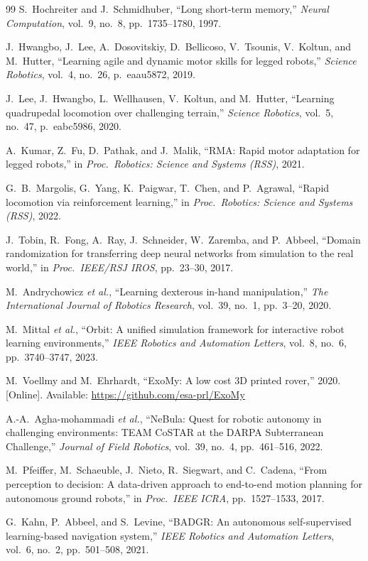 \documentclass[12pt,a4paper]{article}
\begin{document}
\begin{thebibliography}{99}
S.~Hochreiter and J.~Schmidhuber, ``Long short-term memory,'' \textit{Neural Computation}, vol.~9, no.~8, pp.~1735--1780, 1997.

J.~Hwangbo, J.~Lee, A.~Dosovitskiy, D.~Bellicoso, V.~Tsounis, V.~Koltun, and M.~Hutter, ``Learning agile and dynamic motor skills for legged robots,'' \textit{Science Robotics}, vol.~4, no.~26, p.~eaau5872, 2019.

J.~Lee, J.~Hwangbo, L.~Wellhausen, V.~Koltun, and M.~Hutter, ``Learning quadrupedal locomotion over challenging terrain,'' \textit{Science Robotics}, vol.~5, no.~47, p.~eabc5986, 2020.

A.~Kumar, Z.~Fu, D.~Pathak, and J.~Malik, ``RMA: Rapid motor adaptation for legged robots,'' in \textit{Proc.\ Robotics: Science and Systems (RSS)}, 2021.

G.~B.~Margolis, G.~Yang, K.~Paigwar, T.~Chen, and P.~Agrawal, ``Rapid locomotion via reinforcement learning,'' in \textit{Proc.\ Robotics: Science and Systems (RSS)}, 2022.

J.~Tobin, R.~Fong, A.~Ray, J.~Schneider, W.~Zaremba, and P.~Abbeel, ``Domain randomization for transferring deep neural networks from simulation to the real world,'' in \textit{Proc.\ IEEE/RSJ IROS}, pp.~23--30, 2017.

M.~Andrychowicz \textit{et al.}, ``Learning dexterous in-hand manipulation,'' \textit{The International Journal of Robotics Research}, vol.~39, no.~1, pp.~3--20, 2020.

M.~Mittal \textit{et al.}, ``Orbit: A unified simulation framework for interactive robot learning environments,'' \textit{IEEE Robotics and Automation Letters}, vol.~8, no.~6, pp.~3740--3747, 2023.

M.~Voellmy and M.~Ehrhardt, ``ExoMy: A low cost 3D printed rover,'' 2020. [Online]. Available: \url{https://github.com/esa-prl/ExoMy}

A.-A.~Agha-mohammadi \textit{et al.}, ``NeBula: Quest for robotic autonomy in challenging environments: TEAM CoSTAR at the DARPA Subterranean Challenge,'' \textit{Journal of Field Robotics}, vol.~39, no.~4, pp.~461--516, 2022.

M.~Pfeiffer, M.~Schaeuble, J.~Nieto, R.~Siegwart, and C.~Cadena, ``From perception to decision: A data-driven approach to end-to-end motion planning for autonomous ground robots,'' in \textit{Proc.\ IEEE ICRA}, pp.~1527--1533, 2017.

G.~Kahn, P.~Abbeel, and S.~Levine, ``BADGR: An autonomous self-supervised learning-based navigation system,'' \textit{IEEE Robotics and Automation Letters}, vol.~6, no.~2, pp.~501--508, 2021.

\end{thebibliography}
\end{document}
